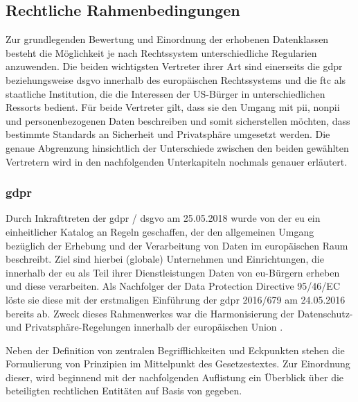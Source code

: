 \subsection{Rechtliche Rahmenbedingungen}
\label{sec:Grundlagen:ssec:Rechtliche Rahmenbedingungen}

Zur grundlegenden Bewertung und Einordnung der erhobenen Datenklassen besteht die Möglichkeit je nach Rechtssystem unterschiedliche Regularien anzuwenden. Die beiden wichtigsten Vertreter ihrer Art sind einerseits die \acl{gdpr} beziehungsweise \acl{dsgvo} innerhalb des europäischen Rechtssystems und die \acl{ftc} als staatliche Institution, die die Interessen der US-Bürger in unterschiedlichen Ressorts bedient. Für beide Vertreter gilt, dass sie den Umgang mit \ac{pii}, \ac{nonpii} und personenbezogenen Daten beschreiben und somit sicherstellen möchten, dass bestimmte Standards an Sicherheit und Privatsphäre umgesetzt werden. Die genaue Abgrenzung hinsichtlich der Unterschiede zwischen den beiden gewählten Vertretern wird in den nachfolgenden Unterkapiteln nochmals genauer erläutert.

\subsubsection{\acl{gdpr}}
\label{sec:Grundlagen:ssec:Rechtliche Rahmenbedingungen:sssec:GDPR}

Durch Inkrafttreten der \ac{gdpr} / \ac{dsgvo} am 25.05.2018 wurde von der \acl{eu} ein einheitlicher Katalog an Regeln geschaffen, der den allgemeinen Umgang bezüglich der Erhebung und der Verarbeitung von Daten im europäischen Raum beschreibt. Ziel sind hierbei (globale) Unternehmen und Einrichtungen, die innerhalb der \acl{eu} als Teil ihrer Dienstleistungen Daten von \ac{eu}-Bürgern erheben und diese verarbeiten. Als Nachfolger der Data Protection Directive 95/46/EC löste sie diese mit der erstmaligen Einführung der \ac{gdpr} 2016/679 am 24.05.2016 bereits ab. Zweck dieses Rahmenwerkes war die Harmonisierung der Datenschutz- und Privatsphäre-Regelungen innerhalb der europäischen Union \cite{Bastos2019}.

Neben der Definition von zentralen Begrifflichkeiten und Eckpunkten stehen die Formulierung von Prinzipien im Mittelpunkt des Gesetzestextes. Zur Einordnung dieser, wird beginnend mit der nachfolgenden Auflistung ein Überblick über die beteiligten rechtlichen Entitäten auf Basis von \cite{DSGVOArt4} gegeben.

